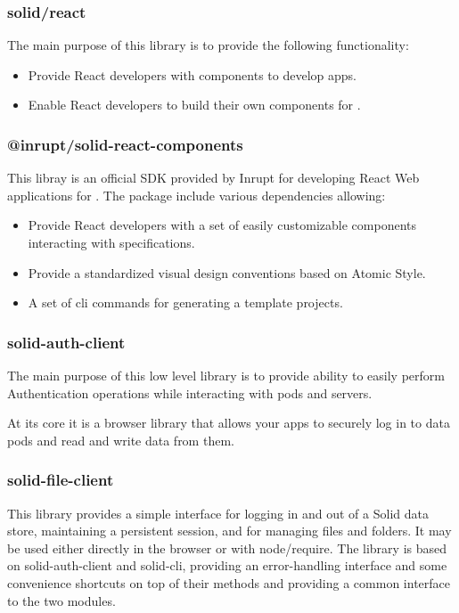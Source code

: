 \subsubsection{solid/react}

The main purpose of this library is to provide the following functionality:

\begin{itemize}
	\item Provide React developers with components to develop \solid{} apps.
    \item Enable React developers to build their own components for \solid{}.
\end{itemize}

\subsubsection{@inrupt/solid-react-components}

This libray is an official SDK provided by Inrupt for developing React Web applications for \solid{}. The package include various dependencies allowing:

\begin{itemize}
	\item Provide React developers with a set of easily customizable components interacting with \solid{} specifications.
    \item Provide a standardized visual design conventions based on Atomic Style.
    \item A set of cli commands for generating a template \solid{} projects.
\end{itemize}

\subsubsection{solid-auth-client}

The main purpose of this low level library is to provide ability to easily perform Authentication operations while interacting with \solid{} pods and servers.

At its core it is a browser library that allows your apps to securely log in to \solid{} data pods and read and write data from them.

\subsubsection{solid-file-client}

This library provides a simple interface for logging in and out of a Solid data store, maintaining a persistent session, and for managing files and folders. It may be used either directly in the browser or with node/require. The library is based on solid-auth-client and solid-cli, providing an error-handling interface and some convenience shortcuts on top of their methods and providing a common interface to the two modules.

